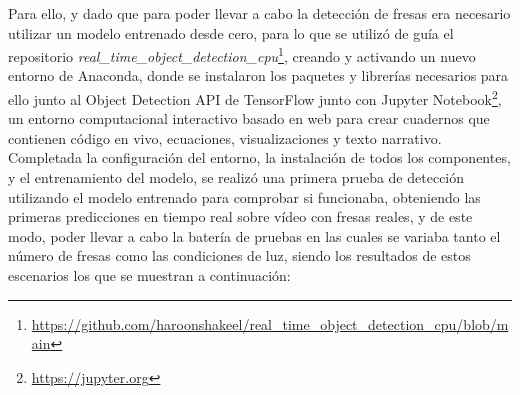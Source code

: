 Para ello, y dado que para poder llevar a cabo la detección de fresas era necesario utilizar un modelo entrenado desde cero, para lo que se utilizó de guía el repositorio \textit{real\_time\_object\_detection\_cpu}\footnote{\url{https://github.com/haroonshakeel/real_time_object_detection_cpu/blob/main}}, creando y activando un nuevo entorno de Anaconda, donde se instalaron los paquetes y librerías necesarios para ello junto al Object Detection API de TensorFlow junto con Jupyter Notebook\footnote{\url{https://jupyter.org}}, un entorno computacional interactivo basado en web para crear cuadernos que contienen código en vivo, ecuaciones, visualizaciones y texto narrativo. \\

Completada la configuración del entorno, la instalación de todos los componentes, y el entrenamiento del modelo, se realizó una primera prueba de detección utilizando el modelo entrenado para comprobar si funcionaba, obteniendo las primeras predicciones en tiempo real sobre vídeo con fresas reales, y de este modo, poder llevar a cabo la batería de pruebas en las cuales se variaba tanto el número de fresas como las condiciones de luz, siendo los resultados de estos escenarios los que se muestran a continuación:
\pagebreak


